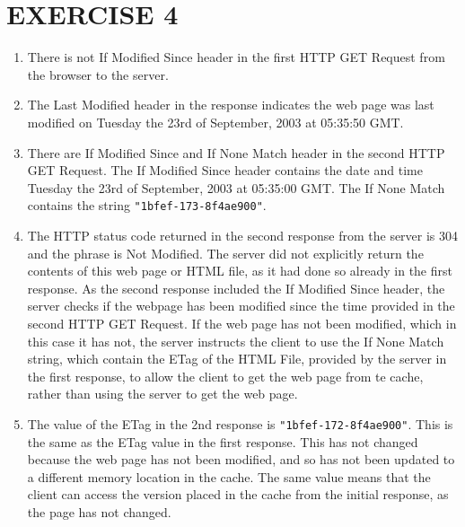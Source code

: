 \documentclass[a4paper,11pt]{article}
\newcommand{\code}{\texttt}
\begin{document}
\section{EXERCISE 4}
\begin{enumerate}[leftmargin=*]
	\item There is not If Modified Since header in the first HTTP GET Request from the browser to the server.
	\item The Last Modified header in the response indicates the web page was last modified on Tuesday the 23rd of September, 2003 at 05:35:50 GMT.
	\item There are If Modified Since and If None Match header in the second HTTP GET Request. The If Modified Since header contains the date and time Tuesday the 23rd of September, 2003 at 05:35:00 GMT. The If None Match contains the string \code{"1bfef-173-8f4ae900"}.
	\item The HTTP status code returned in the second response from the server is 304 and the phrase is Not Modified. The server did not explicitly return the contents of this web page or HTML file, as it had done so already in the first response. As the second response included the If Modified Since header, the server checks if the webpage has been modified since the time provided in the second HTTP GET Request. If the web page has not been modified, which in this case it has not, the server instructs the client to use the If None Match string, which contain the ETag of the HTML File, provided by the server in the first response, to allow the client to get the web page from te cache, rather than using the server to get the web page.
	\item The value of the ETag in the 2nd response is \code{"1bfef-172-8f4ae900"}. This is the same as the ETag value in the first response. This has not changed because the web page has not been modified, and so has not been updated to a different memory location in the cache. The same value means that the client can access the version placed in the cache from the initial response, as the page has not changed.
\end{enumerate}
\end{document}
